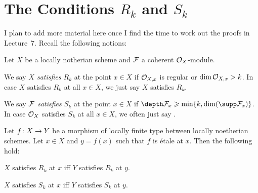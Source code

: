 \section{The Conditions \texorpdfstring{$R_k$}{Rk} and \texorpdfstring{$S_k$}{Sk}}
I plan to add more material here once I find the time to work out the proofs in Lecture~7. Recall the following notions:
\begin{defi*}
	Let $X$ be a locally notherian scheme and $\mathcal{F}$ a coherent $\mathcal{O}_X$-module.
	\begin{alphanumerate}
		\item We say \emph{$X$ satisfies $R_k$} at the point $x\in X$ if $\mathcal{O}_{X,x}$ is regular or  $\dim\mathcal{O}_{X,x}> k$. In case $X$ satisfies $R_k$ at all $x\in X$, we just say $X$ satisfies $R_k$.
		\item We say \emph{$\mathcal{F}$ satisfies $S_k$} at the point $x\in X$ if $\depth \Ff_x\geq \min\{k,\dim(\supp \Ff_x)\}$. In case $\mathcal{O}_X$ satisfies $S_k$ at all $x\in X$, we often just say .
	\end{alphanumerate}
\end{defi*}
\begin{lem*}\label{lem:EtaleRkSk}
	Let $f\colon X\morphism Y$ be a morphism of locally finite type between locally noetherian schemes. Let $x\in X$ and $y=f(x)$ such that $f$ is étale at $x$. Then the following hold:
	\begin{alphanumerate}
		\item $X$ satisfies $R_k$ at $x$ iff $Y$ satisfies $R_k$ at $y$.
		\item $X$ satisfies $S_k$ at $x$ iff $Y$ satisfies $S_k$ at $y$.
	\end{alphanumerate}
\end{lem*}
